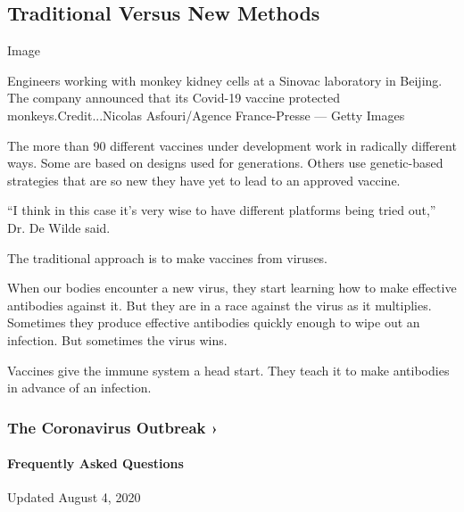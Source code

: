 \hypertarget{traditional-versus-new-methods}{%
\subsection{Traditional Versus New
Methods}\label{traditional-versus-new-methods}}

Image

Engineers working with monkey kidney cells at a Sinovac laboratory in
Beijing. The company announced that its Covid-19 vaccine protected
monkeys.Credit...Nicolas Asfouri/Agence France-Presse --- Getty Images

The more than 90 different vaccines under development work in radically
different ways. Some are based on designs used for generations. Others
use genetic-based strategies that are so new they have yet to lead to an
approved vaccine.

``I think in this case it's very wise to have different platforms being
tried out,'' Dr. De Wilde said.

The traditional approach is to make vaccines from viruses.

When our bodies encounter a new virus, they start learning how to make
effective antibodies against it. But they are in a race against the
virus as it multiplies. Sometimes they produce effective antibodies
quickly enough to wipe out an infection. But sometimes the virus wins.

Vaccines give the immune system a head start. They teach it to make
antibodies in advance of an infection.

\href{https://www.nytimes3xbfgragh.onion/news-event/coronavirus?action=click\&pgtype=Article\&state=default\&region=MAIN_CONTENT_3\&context=storylines_faq}{}

\hypertarget{the-coronavirus-outbreak-}{%
\subsubsection{The Coronavirus Outbreak
›}\label{the-coronavirus-outbreak-}}

\hypertarget{frequently-asked-questions}{%
\paragraph{Frequently Asked
Questions}\label{frequently-asked-questions}}

Updated August 4, 2020

